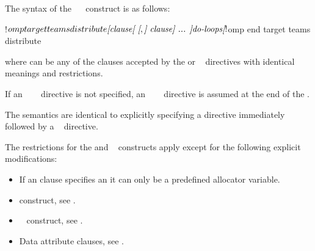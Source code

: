 \begin{fortranspecific}
The syntax of the ~~ construct is as follows:

\begin{ompfPragma}
!$omp target teams distribute \plc{[clause[ [},\plc{] clause] ... ]}
    \plc{do-loops}
\plc{[}!$omp end target teams distribute\plc{]}
\end{ompfPragma}

where  can be any of the clauses accepted by the  or ~ directives
with identical meanings and restrictions.

If an ~~~ directive is not specified, an
~~~ directive is assumed at the end of the .
\end{fortranspecific}

\descr
The semantics are identical to explicitly specifying a  directive immediately
followed by a ~ directive.

\restrictions
The restrictions for the  and ~ constructs apply except for the following explicit modifications:

\begin{itemize}

\item If an  clause specifies an  it can only be a predefined allocator variable.

\end{itemize}

\crossreferences
\begin{itemize}
\item {} construct, see
.

\item {}~ construct, see
.

\item Data attribute clauses, see
.
\end{itemize}










